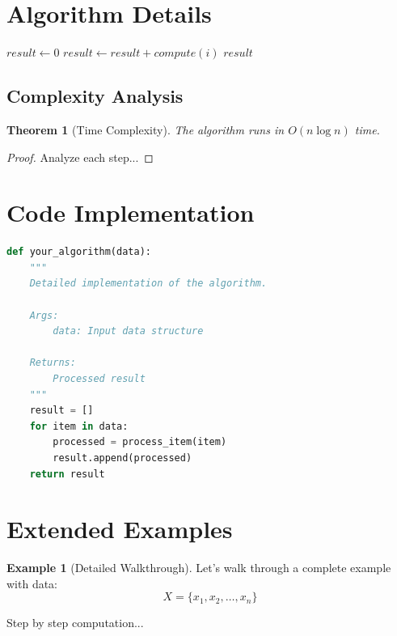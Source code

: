 \documentclass[12pt]{article}
\newtheorem{theorem}{Theorem}
\theoremstyle{definition}
\newtheorem{example}{Example}
\begin{document}
\section{Algorithm Details}

\begin{algorithm}
\caption{Your Algorithm Name}
\begin{algorithmic}[1]
    \State $result \gets 0$
        \State $result \gets result + compute(i)$
    \EndFor
    \State \Return $result$
\EndProcedure
\end{algorithmic}
\end{algorithm}

\subsection{Complexity Analysis}
\begin{theorem}[Time Complexity]
The algorithm runs in $O(n \log n)$ time.
\end{theorem}

\begin{proof}
Analyze each step...
\end{proof}

\section{Code Implementation}

\begin{lstlisting}[language=Python, caption=Python Implementation]
def your_algorithm(data):
    """
    Detailed implementation of the algorithm.

    Args:
        data: Input data structure

    Returns:
        Processed result
    """
    result = []
    for item in data:
        processed = process_item(item)
        result.append(processed)
    return result
\end{lstlisting}

\section{Extended Examples}

\begin{example}[Detailed Walkthrough]
Let's walk through a complete example with data:
\[
X = \{x_1, x_2, \ldots, x_n\}
\]

Step by step computation...
\end{example}
\end{document}
